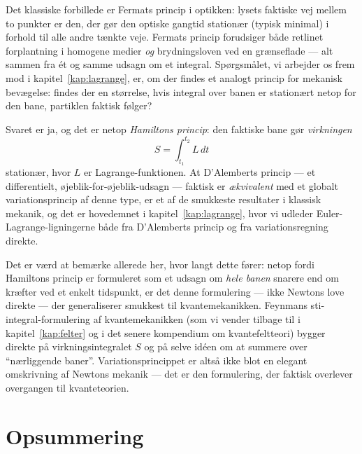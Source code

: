Det klassiske forbillede er Fermats princip i optikken: lysets faktiske
vej mellem to punkter er den, der gør den optiske gangtid stationær
(typisk minimal) i forhold til alle andre tænkte veje. Fermats princip
forudsiger både retlinet forplantning i homogene medier \emph{og}
brydningsloven ved en grænseflade — alt sammen fra ét og samme
udsagn om et integral. Spørgsmålet, vi arbejder os frem mod i
kapitel~\ref{kap:lagrange}, er, om der findes et analogt princip for
mekanisk bevægelse: findes der en størrelse, hvis integral over banen
er stationært netop for den bane, partiklen faktisk følger?

Svaret er ja, og det er netop \emph{Hamiltons
princip}: den faktiske
bane gør \emph{virkningen}
\begin{equation}
  S = \int_{t_1}^{t_2} L\,dt
\end{equation}
stationær, hvor $L$ er Lagrange-funktionen. At D'Alemberts princip —
et differentielt, øjeblik-for-øjeblik-udsagn — faktisk er
\emph{ækvivalent} med et globalt variationsprincip af denne type, er et
af de smukkeste resultater i klassisk mekanik, og det er hovedemnet i
kapitel~\ref{kap:lagrange}, hvor vi udleder Euler-Lagrange-ligningerne
både fra D'Alemberts princip og fra variationsregning direkte.

\begin{bemaerkning}
Det er værd at bemærke allerede her, hvor langt dette fører: netop
fordi Hamiltons princip er formuleret som et udsagn om \emph{hele
banen} snarere end om kræfter ved et enkelt tidspunkt, er det denne
formulering — ikke Newtons love direkte — der generaliserer smukkest
til kvantemekanikken. Feynmans sti-integral-formulering af
kvantemekanikken (som vi vender tilbage til i kapitel~\ref{kap:felter}
og i det senere kompendium om kvantefeltteori) bygger direkte på
virkningsintegralet $S$ og på selve idéen om at summere over
``nærliggende baner''. Variationsprincippet er altså ikke blot en elegant
omskrivning af Newtons mekanik — det er den formulering, der faktisk
overlever overgangen til kvanteteorien.
\end{bemaerkning}

\section{Opsummering}

